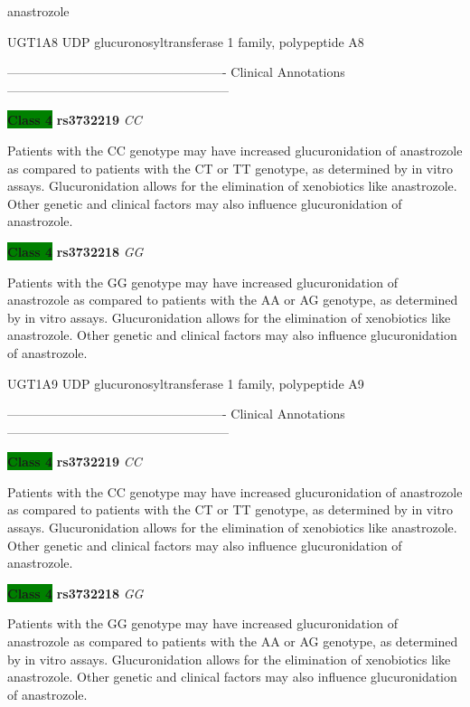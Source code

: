 \documentclass{resume} %
\begin{document}
\begin{rSection}{ anastrozole }
\begin{rSubsection}{ UGT1A8 }{ UDP glucuronosyltransferase 1 family, polypeptide A8 }{}{}
\item[] ---------------------------------------------------- Clinical Annotations -----------------------------------------------------\newline
\item \textbf{\colorbox{green} {Class 4}} \textbf{ rs3732219 } \textit{ CC }
\item[] Patients with the CC genotype may have increased glucuronidation of anastrozole as compared to patients with the CT or TT genotype, as determined by in vitro assays. Glucuronidation allows for the elimination of xenobiotics like anastrozole. Other genetic and clinical factors may also influence glucuronidation of anastrozole. \item \textbf{\colorbox{green} {Class 4}} \textbf{ rs3732218 } \textit{ GG }
\item[] Patients with the GG genotype may have increased glucuronidation of anastrozole as compared to patients with the AA or AG genotype, as determined by in vitro assays. Glucuronidation allows for the elimination of xenobiotics like anastrozole. Other genetic and clinical factors may also influence glucuronidation of anastrozole.
\end{rSubsection}\begin{rSubsection}{ UGT1A9 }{ UDP glucuronosyltransferase 1 family, polypeptide A9 }{}{}
\item[]

\item[] ---------------------------------------------------- Clinical Annotations -----------------------------------------------------\newline
\item \textbf{\colorbox{green} {Class 4}} \textbf{ rs3732219 } \textit{ CC }
\item[] Patients with the CC genotype may have increased glucuronidation of anastrozole as compared to patients with the CT or TT genotype, as determined by in vitro assays. Glucuronidation allows for the elimination of xenobiotics like anastrozole. Other genetic and clinical factors may also influence glucuronidation of anastrozole. \item \textbf{\colorbox{green} {Class 4}} \textbf{ rs3732218 } \textit{ GG }
\item[] Patients with the GG genotype may have increased glucuronidation of anastrozole as compared to patients with the AA or AG genotype, as determined by in vitro assays. Glucuronidation allows for the elimination of xenobiotics like anastrozole. Other genetic and clinical factors may also influence glucuronidation of anastrozole.
\end{rSubsection}


\end{rSection}
\end{document}
